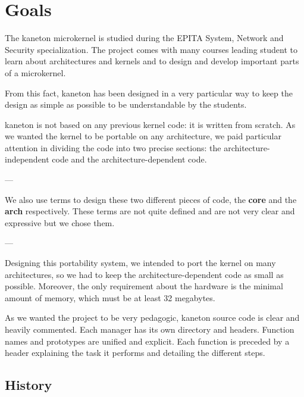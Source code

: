 
%
%

\chapter{Goals}

The kaneton microkernel is studied during the EPITA System, Network
and  Security specialization. The project comes with many courses
leading student to learn about architectures and kernels and to design
and develop important parts of a microkernel.

From this fact, kaneton has been designed in a very particular way to
keep the design as simple as possible to be understandable by the
students.

kaneton is not based on any previous kernel code: it is written from
scratch. As we wanted the kernel to be portable on any architecture,
we paid particular attention in dividing the code into two precise
sections: the architecture-independent code and the
architecture-dependent code.

---

We also use terms to design these two different pieces of code, the
\textbf{core} and the \textbf{arch} respectively. These terms are not
quite defined and are not very clear and expressive but we chose them.

---

Designing this portability system, we intended to port the kernel on
many architectures, so we had to keep the architecture-dependent code
as small as possible. Moreover, the only requirement about the
hardware is the minimal amount of memory, which must be at least 32
megabytes.

As we wanted the project to be very pedagogic, kaneton source code is
clear and heavily commented. Each manager has its own directory and
headers. Function names and prototypes are unified and explicit.
Each function is preceded by a header explaining the task it performs
and detailing the different steps.

%
%

\section{History}

